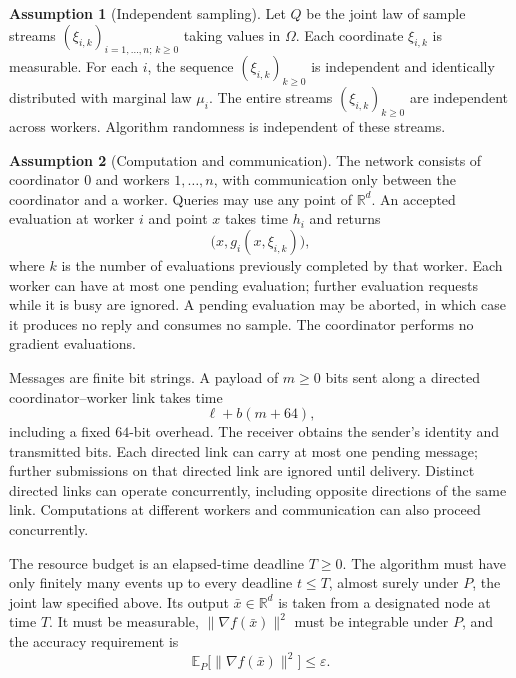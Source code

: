 \documentclass[10pt]{article}
\theoremstyle{definition}
\newtheorem{assumption}{Assumption}
\begin{document}
\begin{assumption}[Independent sampling]
Let $Q$ be the joint law of sample streams $(\xi_{i,k})_{i=1,\ldots,n;\,k\geq0}$ taking values in $\Omega$. Each coordinate $\xi_{i,k}$ is measurable. For each $i$, the sequence $(\xi_{i,k})_{k\geq0}$ is independent and identically distributed with marginal law $\mu_i$. The entire streams $(\xi_{i,k})_{k\geq0}$ are independent across workers. Algorithm randomness is independent of these streams.
\end{assumption}

\begin{assumption}[Computation and communication]
The network consists of coordinator $0$ and workers $1,\ldots,n$, with communication only between the coordinator and a worker. Queries may use any point of $\mathbb{R}^d$. An accepted evaluation at worker $i$ and point $x$ takes time $h_i$ and returns
\[
\bigl(x,g_i(x,\xi_{i,k})\bigr),
\]
where $k$ is the number of evaluations previously completed by that worker. Each worker can have at most one pending evaluation; further evaluation requests while it is busy are ignored. A pending evaluation may be aborted, in which case it produces no reply and consumes no sample. The coordinator performs no gradient evaluations.

Messages are finite bit strings. A payload of $m\geq0$ bits sent along a directed coordinator--worker link takes time
\[
\ell+b(m+64),
\]
including a fixed $64$-bit overhead. The receiver obtains the sender's identity and transmitted bits. Each directed link can carry at most one pending message; further submissions on that directed link are ignored until delivery. Distinct directed links can operate concurrently, including opposite directions of the same link. Computations at different workers and communication can also proceed concurrently.
\end{assumption}

The resource budget is an elapsed-time deadline $T\geq0$. The algorithm must have only finitely many events up to every deadline $t\leq T$, almost surely under $P$, the joint law specified above. Its output $\bar{x}\in\mathbb{R}^d$ is taken from a designated node at time $T$. It must be measurable, $\|\nabla f(\bar{x})\|^2$ must be integrable under $P$, and the accuracy requirement is
\[
\mathbb{E}_{P}\bigl[\|\nabla f(\bar{x})\|^2\bigr]\leq\varepsilon.
\]
\end{document}
